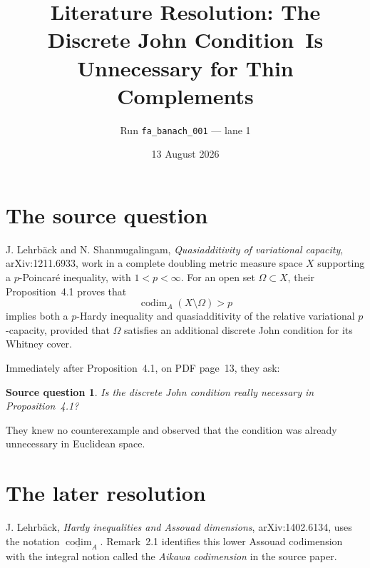 \documentclass[11pt]{article}
\title{Literature Resolution: The Discrete John Condition\
Is Unnecessary for Thin Complements}
\author{Run \texttt{fa\_banach\_001} --- lane 1}
\date{13 August 2026}
\newtheorem*{question}{Source question}
\begin{document}
\maketitle

\begin{center}
\end{center}

\section{The source question}

J. Lehrb\"ack and N. Shanmugalingam, \emph{Quasiadditivity of variational
capacity}, arXiv:1211.6933, work in a complete doubling metric measure
space $X$ supporting a $p$-Poincar\'e inequality, with $1<p<\infty$.
For an open set $\Omega\subset X$, their Proposition~4.1 proves that
\[
  \operatorname{codim}_{A}(X\setminus\Omega)>p
\]
implies both a $p$-Hardy inequality and quasiadditivity of the relative
variational $p$-capacity, provided that $\Omega$ satisfies an additional
discrete John condition for its Whitney cover.

Immediately after Proposition~4.1, on PDF page~13, they ask:

\begin{question}
Is the discrete John condition really necessary in Proposition~4.1?
\end{question}

They knew no counterexample and observed that the condition was already
unnecessary in Euclidean space.

\section{The later resolution}

J. Lehrb\"ack, \emph{Hardy inequalities and Assouad dimensions},
arXiv:1402.6134, uses the notation
$\underline{\operatorname{codim}}_{A}$.  Remark~2.1 identifies this lower
Assouad codimension with the integral notion called the \emph{Aikawa
codimension} in the source paper.
\end{document}
